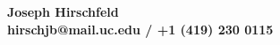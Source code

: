\begin{center}
    \textbf{{\large Joseph Hirschfeld} \\ hirschjb@mail.uc.edu / +1 (419) 230 0115}
\end{center}
